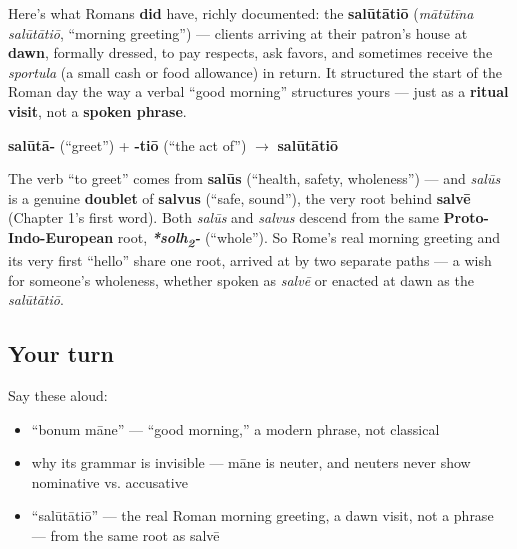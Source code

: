 \begin{culture}
Here's what Romans \textbf{did} have, richly documented: the \textbf{salūtātiō} (\emph{mātūtīna salūtātiō}, \textquotedblleft{}morning greeting\textquotedblright{}) — clients arriving at their patron's house at \textbf{dawn}, formally dressed, to pay respects, ask favors, and sometimes receive the \emph{sportula} (a small cash or food allowance) in return. It structured the start of the Roman day the way a verbal \textquotedblleft{}good morning\textquotedblright{} structures yours — just as a \textbf{ritual visit}, not a \textbf{spoken phrase}.

\textbf{salūtā-} (\textquotedblleft{}greet\textquotedblright{}) + \textbf{-tiō} (\textquotedblleft{}the act of\textquotedblright{}) $\to$ \textbf{salūtātiō}

The verb \textquotedblleft{}to greet\textquotedblright{} comes from \textbf{salūs} (\textquotedblleft{}health, safety, wholeness\textquotedblright{}) — and \emph{salūs} is a genuine \textbf{doublet} of \textbf{salvus} (\textquotedblleft{}safe, sound\textquotedblright{}), the very root behind \textbf{salvē} (Chapter 1's first word). Both \emph{salūs} and \emph{salvus} descend from the same \textbf{Proto-Indo-European} root, \emph{\textbf{*solh\textsubscript{2}-}} (\textquotedblleft{}whole\textquotedblright{}). So Rome's real morning greeting and its very first \textquotedblleft{}hello\textquotedblright{} share one root, arrived at by two separate paths — a wish for someone's wholeness, whether spoken as \emph{salvē} or enacted at dawn as the \emph{salūtātiō}.
\end{culture}

\subsection*{Your turn}
Say these aloud:

\begin{itemize}
\raggedright
  \item \textquotedblleft{}bonum māne\textquotedblright{} — \textquotedblleft{}good morning,\textquotedblright{} a modern phrase, not classical
  \item why its grammar is invisible — māne is neuter, and neuters never show nominative vs. accusative
  \item \textquotedblleft{}salūtātiō\textquotedblright{} — the real Roman morning greeting, a dawn visit, not a phrase — from the same root as salvē
\end{itemize}

